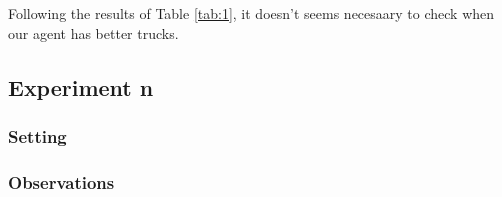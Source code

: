 \documentclass[11pt]{article}
\begin{document}
Following the results of Table \ref{tab:1}, it doesn't seems necesaary to check when our agent has better trucks.

\subsection{Experiment n}

\subsubsection{Setting}

\subsubsection{Observations}
\end{document}
